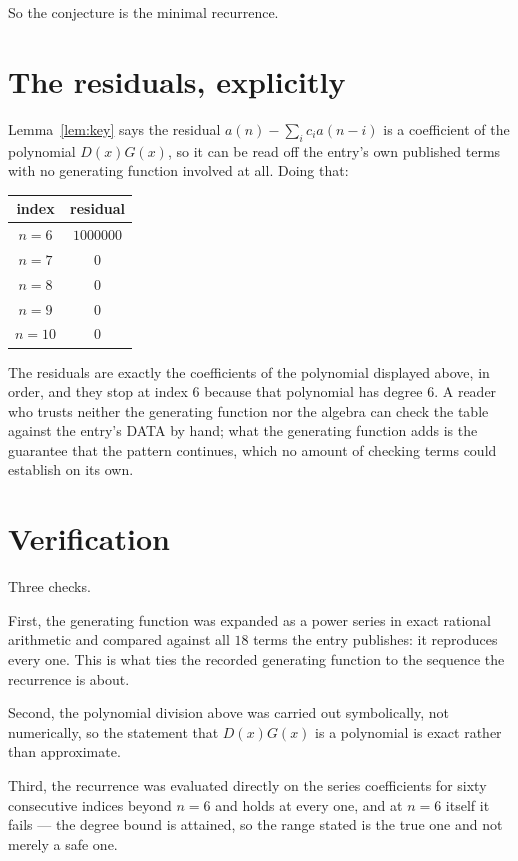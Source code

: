 \documentclass[11pt,a4paper]{article}
\theoremstyle{plain}
\theoremstyle{definition}
\begin{document}
So the conjecture is the minimal recurrence.

\section{The residuals, explicitly}

Lemma~\ref{lem:key} says the residual $a(n)-\sum_ic_ia(n-i)$ is a coefficient of the
polynomial $D(x)G(x)$, so it can be read off the entry's own published terms with no
generating function involved at all. Doing that:
\begin{center}
\begin{tabular}{cc}
index & residual \\ \hline
$n=6$ & $1000000$ \\
$n=7$ & $0$ \\
$n=8$ & $0$ \\
$n=9$ & $0$ \\
$n=10$ & $0$
\end{tabular}
\end{center}
The residuals are exactly the coefficients of the polynomial displayed above, in order, and
they stop at index $6$ because that polynomial has degree $6$. A reader who trusts
neither the generating function nor the algebra can check the table against the entry's DATA
by hand; what the generating function adds is the guarantee that the pattern continues, which
no amount of checking terms could establish on its own.

\section{Verification}

Three checks.

First, the generating function was expanded as a power series in exact rational arithmetic and
compared against all $18$ terms the entry publishes: it reproduces every one. This is
what ties the recorded generating function to the sequence the recurrence is about.

Second, the polynomial division above was carried out symbolically, not numerically, so the
statement that $D(x)G(x)$ is a polynomial is exact rather than approximate.

Third, the recurrence was evaluated directly on the series coefficients for sixty consecutive
indices beyond $n=6$ and holds at every one, and at $n=6$ itself it fails --- the
degree bound is attained, so the range stated is the true one and not merely a safe one.
\end{document}
